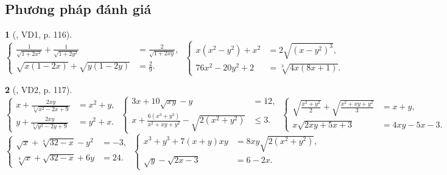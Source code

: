 \documentclass{article}
\newtheorem{baitoan}{}
\begin{document}
\subsection{Phương pháp đánh giá}

\begin{baitoan}[\cite{Kien_dai_so_9}, VD1, p. 116]
	\begin{equation*}
		\left\{\begin{split}
			\frac{1}{\sqrt{1 + 2x^2}} + \frac{1}{\sqrt{1 + 2y^2}} &= \frac{2}{\sqrt{1 + 2xy}},\\
			\sqrt{x(1 - 2x)} + \sqrt{y(1 - 2y)} &= \frac{2}{9}.
		\end{split}\right.\ \left\{\begin{split}
			x(x^2 - y^2)+ x^2 &= 2\sqrt{(x - y^2)^3},\\
			76x^2 - 20y^2 + 2 &= \sqrt[3]{4x(8x + 1)}.
		\end{split}\right.
	\end{equation*}
\end{baitoan}

\begin{baitoan}[\cite{Kien_dai_so_9}, VD2, p. 117]
	\begin{equation*}
		\left\{\begin{split}
			x + \frac{2xy}{\sqrt[3]{x^2 - 2x + 9}} &= x^2 + y,\\
			y + \frac{2xy}{\sqrt[3]{y^2 - 2y + 9}} &= y^2 + x.
		\end{split}\right.\ \left\{\begin{split}
			3x + 10\sqrt{xy} - y &= 12,\\
			x + \frac{6(x^3 + y^3)}{x^2 + xy + y^2} - \sqrt{2(x^2 + y^2)} &\le 3.
		\end{split}\right.\ \left\{\begin{split}
			\sqrt{\frac{x^2 + y^2}{2}} + \sqrt{\frac{x^2 + xy + y^2}{3}} &= x + y,\\
			x\sqrt{2xy + 5x + 3} &= 4xy - 5x - 3.
		\end{split}\right.
	\end{equation*}
	\begin{equation*}
		\left\{\begin{split}
			\sqrt{x} + \sqrt[4]{32 - x} - y^2 &= -3,\\
			\sqrt[4]{x} + \sqrt{32 - x} + 6y &= 24.
		\end{split}\right.\ \left\{\begin{split}
			x^3 + y^3 + 7(x + y)xy &= 8xy\sqrt{2(x^2 + y^2)},\\
			\sqrt{y} - \sqrt{2x - 3} &= 6 - 2x.
		\end{split}\right.
	\end{equation*}
\end{baitoan}
\end{document}
